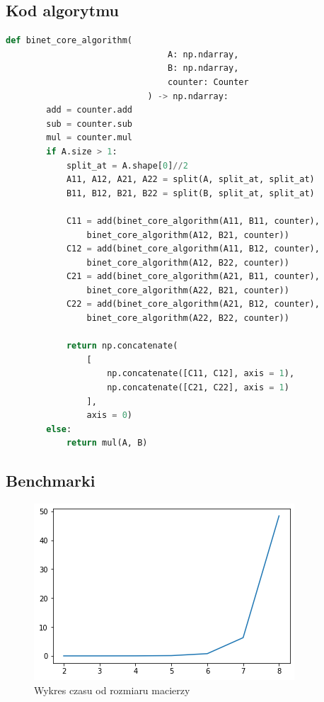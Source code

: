 \documentclass[12pt,a4paper,table]{article}
\begin{document}
    \subsection{Kod algorytmu}
    \begin{lstlisting}[language=Python]
    def binet_core_algorithm(
                                A: np.ndarray, 
                                B: np.ndarray, 
                                counter: Counter
                            ) -> np.ndarray:
        add = counter.add
        sub = counter.sub
        mul = counter.mul
        if A.size > 1:
            split_at = A.shape[0]//2
            A11, A12, A21, A22 = split(A, split_at, split_at)
            B11, B12, B21, B22 = split(B, split_at, split_at)
            
            C11 = add(binet_core_algorithm(A11, B11, counter), 
                binet_core_algorithm(A12, B21, counter))
            C12 = add(binet_core_algorithm(A11, B12, counter), 
                binet_core_algorithm(A12, B22, counter))
            C21 = add(binet_core_algorithm(A21, B11, counter), 
                binet_core_algorithm(A22, B21, counter))
            C22 = add(binet_core_algorithm(A21, B12, counter), 
                binet_core_algorithm(A22, B22, counter))
            
            return np.concatenate(
                [
                    np.concatenate([C11, C12], axis = 1),
                    np.concatenate([C21, C22], axis = 1)
                ],
                axis = 0)
        else:
            return mul(A, B)
    \end{lstlisting}

    \subsection{Benchmarki}

    \begin{figure}[H]
        \centering
        \includegraphics[width=0.6\linewidth]{img/binet_times.png}
        \caption{Wykres czasu od rozmiaru macierzy}
        \label{fig:binet_times}
    \end{figure}
\end{document}
